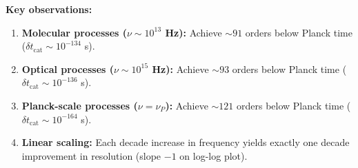 \documentclass[twocolumn,10pt]{article}
\theoremstyle{remark}
\begin{document}
\textbf{Key observations:}
\begin{enumerate}
    \item \textbf{Molecular processes ($\nu \sim 10^{13}$ Hz):} Achieve $\sim 91$ orders below Planck time ($\delta t_{\text{cat}} \sim 10^{-134}$ s).
    
    \item \textbf{Optical processes ($\nu \sim 10^{15}$ Hz):} Achieve $\sim 93$ orders below Planck time ($\delta t_{\text{cat}} \sim 10^{-136}$ s).
    
    \item \textbf{Planck-scale processes ($\nu = \nu_P$):} Achieve $\sim 121$ orders below Planck time ($\delta t_{\text{cat}} \sim 10^{-164}$ s).
    
    \item \textbf{Linear scaling:} Each decade increase in frequency yields exactly one decade improvement in resolution (slope $-1$ on log-log plot).
\end{enumerate}
\end{document}
